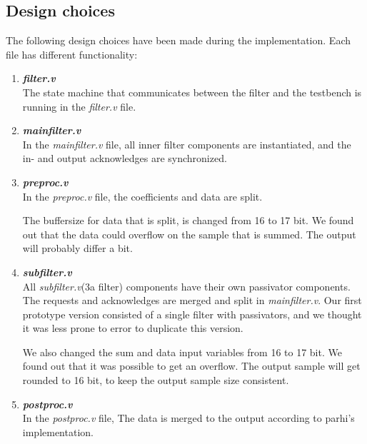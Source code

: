 \documentclass[a4paper,twoside,11pt, fleqn]{article}
\begin{document}
\subsection{Design choices}
The following design choices have been made during the implementation. Each file has different functionality:

\begin{enumerate}
\item \textbf{\textit{filter.v}}\\
The state machine that communicates between the filter and the testbench is running in the \textit{filter.v} file.

\item \textbf{\textit{mainfilter.v}}\\	
In the \textit{mainfilter.v} file, all inner filter components are instantiated, and the in- and output acknowledges are synchronized.	

\item \textbf{\textit{preproc.v}}\\	
In the \textit{preproc.v} file, the coefficients and data are split.

The buffersize for data that is split, is changed from 16 to 17 bit. We found out that the data could overflow on the sample that is summed. The output will probably differ a bit.

\item \textbf{\textit{subfilter.v}}\\
{All \textit{subfilter.v}(3a filter) components have their own passivator components. The requests and acknowledges are merged and split in \textit{mainfilter.v}. Our first prototype version consisted of a single filter with passivators, and we thought it was less prone to error to duplicate this version.}

We also changed the sum and data input variables from 16 to 17 bit. We found out that it was possible to get an overflow. The output sample will get rounded to 16 bit, to keep the output sample size consistent.	

\item \textbf{\textit{postproc.v}}\\	
In the \textit{postproc.v} file, The data is merged to the output according to parhi's implementation.	
\end{enumerate}
\end{document}
